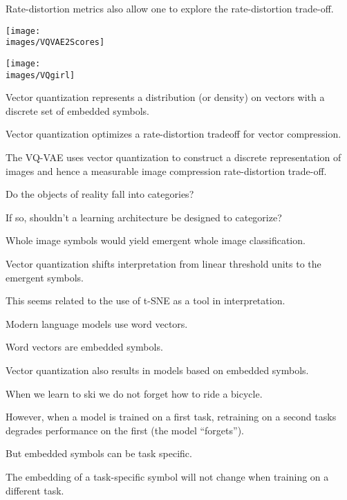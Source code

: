 {\vfill
Rate-distortion metrics also allow one to explore the rate-distortion trade-off.

\vfill
\centerline{\texttt{[image: \\images/VQVAE2Scores]}}


\vfill
\centerline{\texttt{[image: \\images/VQgirl]}}



Vector quantization represents a distribution (or density) on vectors with a discrete set of embedded symbols.

\vfill
Vector quantization optimizes a rate-distortion tradeoff for vector compression.

\vfill
The VQ-VAE uses vector quantization to construct a discrete representation of images and hence a measurable image compression rate-distortion trade-off.


Do the objects of reality fall into categories?

\vfill
If so, shouldn't a learning architecture be designed to categorize?

\vfill
Whole image symbols would yield emergent whole image classification.


Vector quantization shifts interpretation from linear threshold units to the emergent symbols.

\vfill
This seems related to the use of t-SNE as a tool in interpretation.



Modern language models use word vectors.

\vfill
Word vectors are embedded symbols.

\vfill
Vector quantization also results in models based on embedded symbols.

When we learn to ski we do not forget how to ride a bicycle.

\vfill
However, when a model is trained on a first task, retraining on a second tasks degrades performance on the first (the model ``forgets'').

\vfill
But embedded symbols can be task specific.

\vfill
The embedding of a task-specific symbol will not change when training on a different task.


}

